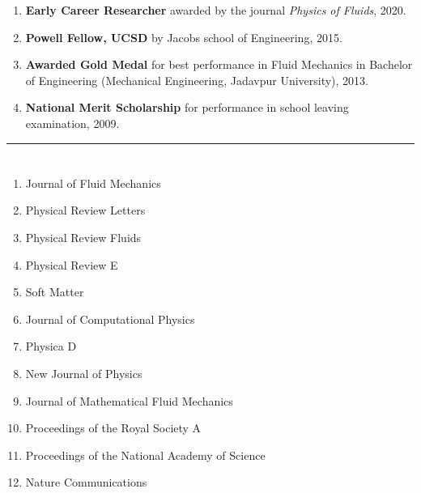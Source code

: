 \documentclass[10pt]{res} %
\begin{document}
\begin{resume}
\begin{enumerate}
	\item \textbf{Early Career Researcher} awarded by the journal \textit{Physics of Fluids}, 2020.
	
	\item \textbf{Powell Fellow, UCSD} by Jacobs school of Engineering, 2015.
	
	
	\item \textbf{Awarded Gold Medal} for best performance in Fluid Mechanics in Bachelor of Engineering (Mechanical Engineering, Jadavpur University), 2013.
	
	\item \textbf{National Merit Scholarship} for performance in school leaving examination, 2009.
\end{enumerate}

\vspace*{-5mm}
\noindent\rule{\textwidth}{0.6pt}
\vspace*{-10mm}
\section{}
\vspace*{3mm}


\begin{multicols}{2}
	\begin{enumerate}
		\item Journal of Fluid Mechanics
		\item Physical Review Letters
		\item Physical Review Fluids
		\item Physical Review E
		\item Soft Matter
		\item Journal of Computational Physics
		\item Physica D
		\item New Journal of Physics
		\item Journal of Mathematical Fluid Mechanics
		\item Proceedings of the Royal Society A
		\item Proceedings of the National Academy of Science
		\item Nature Communications
	\end{enumerate}
\end{multicols}


\end{resume}
\end{document}
